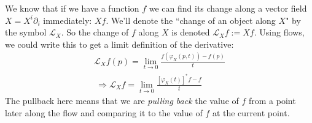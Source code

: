 \documentclass[../master.tex]{subfiles}
\begin{document}
		


		
		
		
	We know that if we have a function $f$ we can find its change along a vector field $X = X^i \partial_i$ immediately: $Xf$. We'll denote the ``change of an object along $X$" by the symbol $\mathcal L_X$. So the change of $f$ along $X$ is denoted $\mathcal L_X f := Xf$. Using flows, we could write this to get a limit definition of the derivative:
		\begin{align*}
			\mathcal L_X f(p) = \lim_{t \rightarrow 0} \frac{f(\varphi_X(p,t)) - f(p)}{t}\\\
			\Rightarrow \mathcal L_X f = \lim_{t \rightarrow 0} \frac{[\varphi_X(t)]^* f - f}{t}
		\end{align*}
		The pullback here means that we are \emph{pulling back} the value of $f$ from a point later along the flow and comparing it to the value of $f$ at the current point.
		
\end{document}
